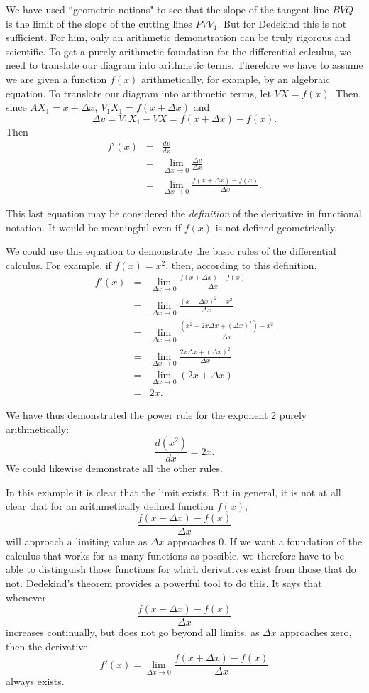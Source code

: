 \documentclass[polutonikogreek,english,twoside,openright]{article}
\newlength{\oldjot}
\begin{document}
We have used ``geometric notions" to see that the slope of the tangent
line $BVQ$ is the limit of the slope of the cutting lines $PVV_1$.
But for Dedekind this is not sufficient.  For him, only an arithmetic
demonstration can be truly rigorous and scientific. To get a purely
arithmetic foundation for the differential calculus, we need to
translate our diagram into arithmetic terms.  Therefore we have to
assume we are given a function $f(x)$ arithmetically, for example, by
an algebraic equation.  To translate our diagram into arithmetic
terms, let $VX=f(x)$.  Then, since $AX_1=x + \Delta x$,
$V_1X_1 = f(x+\Delta x)$ and
$$\Delta v = V_1X_1 - VX = f(x+\Delta x) - f(x).$$
Then
\setlength{\jot}{1.5ex}
\begin{eqnarray*}
  f'(x) & = & \frac{dv}{dx}\\
        & = & \lim_{\Delta x \rightarrow 0}\frac{\Delta v}{\Delta x}\\
        & = &  \lim_{\Delta x \rightarrow 0}\frac{f(x+\Delta x) - f(x)}{\Delta x}.
\end{eqnarray*}
\setlength{\jot}{\oldjot}

\noindent
This last equation may be considered the {\em definition} of the
derivative in functional notation.  It would be meaningful even if
$f(x)$ is not defined geometrically.

We could use this equation to demonstrate the basic rules of the
differential calculus.  For example, if $f(x) = x^2$, then, according
to this definition,
\setlength{\jot}{1.5ex}
\begin{eqnarray*}
  f'(x) & = &  \lim_{\Delta x \rightarrow 0}\frac{f(x+\Delta x) - f(x)}{\Delta x} \\
        & = & \lim_{\Delta x \rightarrow 0} \frac{(x+\Delta x)^2 - x^2}{\Delta x}\\
        & = &  \lim_{\Delta x \rightarrow 0} \frac{(x^2 + 2x\Delta x + (\Delta x)^2) - x^2}{\Delta x}\\
        & = &  \lim_{\Delta x \rightarrow 0} \frac{2x\Delta x + (\Delta x)^2}{\Delta x}\\
        & = &  \lim_{\Delta x \rightarrow 0} (2x + \Delta x)\\
        & = & 2x.
\end{eqnarray*}
\setlength{\jot}{\oldjot}

\noindent We have thus demonstrated the power rule for the exponent 2
purely arithmetically:
$$\frac{d(x^2)}{dx}= 2x.$$
We could likewise demonstrate all the other rules.

In this example it is clear that the limit exists.  But in general, it
is not at all clear that for an arithmetically defined function
$f(x)$,
$$\frac{f(x+\Delta x) - f(x)}{\Delta x}$$
will approach a limiting value as $\Delta x$ approaches 0.  If we want
a foundation of the calculus that works for as many functions as
possible, we therefore have to be able to distinguish those functions
for which derivatives exist from those that do not.  Dedekind's
theorem provides a powerful tool to do this.  It says that whenever
$$\frac{f(x+\Delta x) - f(x)}{\Delta x}$$
increases continually, but does not go beyond all limits, as
$\Delta x$ approaches zero, then the derivative
$$f'(x) = \lim_{\Delta x \rightarrow 0} \frac{f(x+\Delta x) - f(x)}{\Delta x}$$
always exists. 
\end{document}
